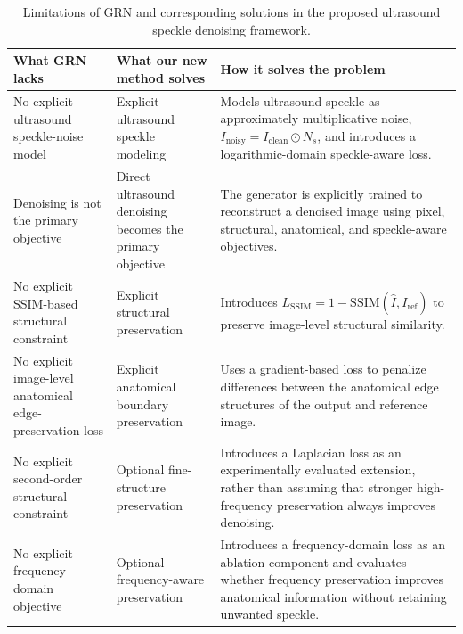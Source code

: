 \documentclass[conference]{IEEEtran}
\begin{document}
\begin{table}[t]
\centering
\caption{Limitations of GRN and corresponding solutions in the proposed ultrasound speckle denoising framework.}
\label{tab:grn_limitations}

\renewcommand{\arraystretch}{1.45}
\setlength{\tabcolsep}{5pt}

\begin{tabularx}{\textwidth}{
    >{\raggedright\arraybackslash}m{}
    >{\raggedright\arraybackslash}m{}
    >{\raggedright\arraybackslash}X
}
\toprule

\textbf{What GRN lacks}
&
\textbf{What our new method solves}
&
\textbf{How it solves the problem}
\\

\midrule

No explicit ultrasound speckle-noise model
&
Explicit ultrasound speckle modeling
&
Models ultrasound speckle as approximately multiplicative noise,
$I_{\mathrm{noisy}}
=
I_{\mathrm{clean}}\odot N_s$,
and introduces a logarithmic-domain speckle-aware loss.
\\

Denoising is not the primary objective
&
Direct ultrasound denoising becomes the primary objective
&
The generator is explicitly trained to reconstruct a denoised image
using pixel, structural, anatomical, and speckle-aware objectives.
\\

No explicit SSIM-based structural constraint
&
Explicit structural preservation
&
Introduces
$L_{\mathrm{SSIM}}
=
1-\mathrm{SSIM}(\hat I,I_{\mathrm{ref}})$
to preserve image-level structural similarity.
\\

No explicit image-level anatomical edge-preservation loss
&
Explicit anatomical boundary preservation
&
Uses a gradient-based loss to penalize differences between the
anatomical edge structures of the output and reference image.
\\

No explicit second-order structural constraint
&
Optional fine-structure preservation
&
Introduces a Laplacian loss as an experimentally evaluated extension,
rather than assuming that stronger high-frequency preservation always
improves denoising.
\\

No explicit frequency-domain objective
&
Optional frequency-aware preservation
&
Introduces a frequency-domain loss as an ablation component and
evaluates whether frequency preservation improves anatomical
information without retaining unwanted speckle.
\\


\end{tabularx}
\end{table}
\end{document}
